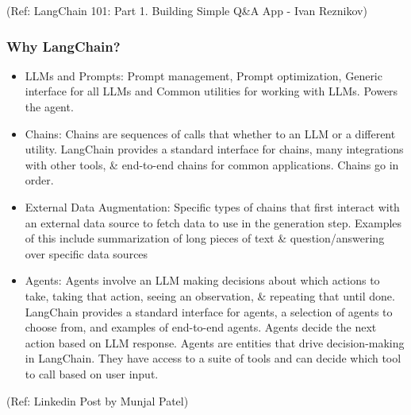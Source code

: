 \begin{frame}[fragile]
			{\tiny (Ref: LangChain 101: Part 1. Building Simple Q\&A App - Ivan Reznikov)}
			
		

\end{frame}

\begin{frame}\frametitle{Why LangChain?}

\begin{itemize}
\item LLMs and Prompts: Prompt management, Prompt optimization, Generic interface for all LLMs and Common utilities for working with LLMs. Powers the agent.
\item Chains: Chains are sequences of calls that whether to an LLM or a different utility. LangChain provides a standard interface for chains, many integrations with other tools, \& end-to-end chains for common applications. Chains go in order.
\item External Data Augmentation: Specific types of chains that first interact with an external data source to fetch data to use in the generation step. Examples of this include summarization of long pieces of text \& question/answering over specific data sources
\item Agents: Agents involve an LLM making decisions about which actions to take, taking that action, seeing an observation, \& repeating that until done. LangChain provides a standard interface for agents, a selection of agents to choose from, and examples of end-to-end agents. Agents decide the next action based on LLM response. Agents are entities that drive decision-making in LangChain. They have access to a suite of tools and can decide which tool to call based on user input. 
\end{itemize}

{\tiny (Ref: Linkedin Post by Munjal Patel)}
\end{frame}


